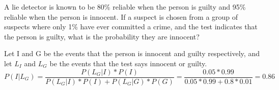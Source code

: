\question A lie detector is known to be 80\% reliable when the person 
is guilty and 95\% reliable when the person is innocent. If a suspect 
is chosen from a group of suspects where only 1\% have ever committed 
a crime, and the test indicates that the person is guilty, what is the 
probability they are innocent?
\vspace{5cm}
\begin{solution}
Let I and G be the events that the person is innocent and guilty 
respectively, and let $L_I$ and $L_G$ be the events that the test 
says innocent or guilty. 
\[P(I | L_G) = 
\frac{P(L_G | I)*P(I)}{ 
 P(L_G | I)*P(I) + P(L_G | G)*P(G) } = \frac{0.05*0.99}{0.05*0.99 + 0.8*0.01} = 0.86\]
 \end{solution}